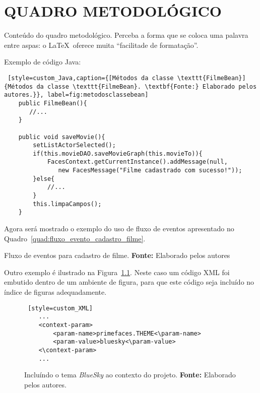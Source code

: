
\chapter{QUADRO METODOLÓGICO}
\label{cap:quadroMetodologico}

\par Conteúdo do quadro metodológico. Perceba a forma que se coloca uma palavra entre aspas: o \LaTeX~oferece muita ``facilitade de formatação''.

Exemplo de código Java:

\begin{lstlisting} [style=custom_Java,caption={[Métodos da classe \texttt{FilmeBean}]{Métodos da classe \texttt{FilmeBean}. \textbf{Fonte:} Elaborado pelos autores.}}, label=fig:metodosclassebean] 	
	public FilmeBean(){  
       //...
   	}	
   	
	public void saveMovie(){
		setListActorSelected();		
		if(this.movieDAO.saveMovieGraph(this.movieTo)){
			FacesContext.getCurrentInstance().addMessage(null, 
			   new FacesMessage("Filme cadastrado com sucesso!")); 
		}else{
			//...
		}		
		this.limpaCampos();
	}
\end{lstlisting}

\par Agora será mostrado o exemplo do uso de fluxo de eventos apresentado no Quadro~\ref{quad:fluxo_evento_cadastro_filme}.

\begin{quadro}[h!]
  
  \caption[Fluxo de eventos para cadastro de filme]
           {Fluxo de eventos para cadastro de filme. \textbf{Fonte:} Elaborado pelos autores}
  \label{quad:fluxo_evento_cadastro_filme}
\end{quadro}

\par Outro exemplo é ilustrado na Figura~\ref{fig:bluesky}. Neste caso um código XML foi embutido dentro de um ambiente de figura, para que este código seja incluído no índice de figuras adequadamente.
 
\begin{figure}[ht!]
  \begin{lstlisting} [style=custom_XML]
	...
	<context-param>
		<param-name>primefaces.THEME<\param-name>
		<param-value>bluesky<\param-value>
	<\context-param>
	...
  \end{lstlisting}
  \caption[Incluindo o tema \textit{BlueSky} ao contexto do projeto]
          {Incluíndo o tema \textit{BlueSky} ao contexto do projeto. \textbf{Fonte:} Elaborado pelos autores.}
  \label{fig:bluesky}
\end{figure}
